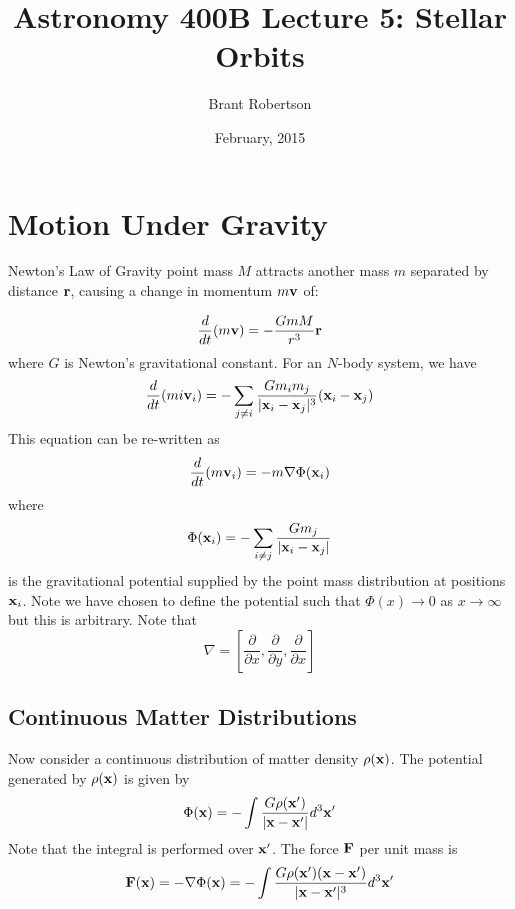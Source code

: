 \documentclass[]{article}
\title{Astronomy 400B Lecture 5: Stellar Orbits}
\author{Brant Robertson}
\date{February, 2015}
\begin{document}
\maketitle

\section{Motion Under Gravity}

Newton's Law of Gravity point mass $M$ attracts another mass $m$ separated by 
distance $\mathbf{r}$, causing a change in momentum $m\mathbf{v}$ of:

\begin{equation}
\frac{d}{dt}(m\mathbf{v}) = -\frac{GmM}{r^{3}} \mathbf{r}
\end{equation}
\noindent
where $G$ is Newton's gravitational constant. For an $N$-body system, we have
\begin{equation}
\frac{d}{dt}(m{i}\mathbf{v}_{i}) = -\sum_{j\ne i}\frac{G m_{i} m_{j}}{|\mathbf{x}_i - \mathbf{x}_j|^{3}} (\mathbf{x}_i - \mathbf{x}_j)
\end{equation}
\noindent
This equation can be re-written as
\begin{equation}
\frac{d}{dt}(m \mathbf{v}_i) = - m \nabla\Phi(\mathbf{x}_i)
\end{equation}
\noindent
where
\begin{equation}
\Phi(\mathbf{x}_i) = - \sum_{i\ne j} \frac{G m_j}{|\mathbf{x}_i - \mathbf{x}_j|}
\end{equation}
\noindent
is the gravitational potential supplied by the point mass distribution at positions $\mathbf{x}_i$.
Note we have chosen to define the potential such that $\Phi(x)\to0$ as $x\to\infty$ but
this is arbitrary. Note that
\begin{equation}
\nabla = \left[\frac{\partial}{\partial x},\frac{\partial}{\partial y},\frac{\partial}{\partial x}\right]
\end{equation}

\subsection{Continuous Matter Distributions}
Now consider a continuous distribution of matter density $\rho(\mathbf{x})$.  The
potential generated by $\rho(\mathbf{x})$ is given by
\begin{equation}
\label{eqn:potential}
\Phi(\mathbf{x}) = - \int \frac{G\rho(\mathbf{x}')}{|\mathbf{x} - \mathbf{x}'|}d^{3}\mathbf{x}'
\end{equation}
\noindent
Note that the integral is performed over $\mathbf{x}'$.  The force $\mathbf{F}$ per unit mass
is
\begin{equation}
\mathbf{F}(\mathbf{x}) = - \nabla \Phi(\mathbf{x}) = - \int \frac{G\rho(\mathbf{x}')(\mathbf{x}-\mathbf{x}')}{|\mathbf{x}-\mathbf{x}'|^{3}}d^{3}\mathbf{x}'
\end{equation}
\end{document}

